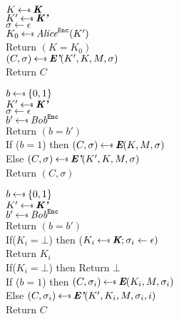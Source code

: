 
\begin{figure}[h]
{
$K\getsr \emph{\textbf{K}}$\\
$K'\getsr \emph{\textbf{K'}}$\\
$\sigma\gets \epsilon$\\
$K_0\getsr \emph{Alice}^{\mathtt{Enc}}(K')$\\
Return $(K=K_0)$\\
$(C,\sigma)\getsr\emph{\textbf{E'}}(K',K,M,\sigma)$\\
Return $C$
}
\vspace{-1ex}
\end{figure}

\begin{figure}[h]
{
$b\getsr \bits$\\
$K'\getsr \emph{\textbf{K'}}$\\
$\sigma\gets \epsilon$\\
$b'\getsr \emph{Bob}^{\mathtt{Enc}}$\\
Return $(b=b')$\\
If ($b=1$) then $(C,\sigma)\getsr \emph{\textbf{E}}(K,M,\sigma)$\\
Else $(C,\sigma)\getsr \emph{\textbf{E'}}(K',K,M,\sigma)$\\
Return $(C,\sigma)$
}
\vspace{-1ex}
\end{figure}

\begin{figure}[h]
{
$b\getsr \bits$\\
$K'\getsr \emph{\textbf{K'}}$\\
$b'\getsr \emph{Bob}^{\mathtt{Enc}}$\\
Return $(b=b')$\\
If($K_i=\bot$) then ($K_i\getsr \emph{\textbf{K}}; \sigma_i \gets \epsilon)$\\
Return $K_i$\\
If($K_i=\bot$) then Return $\bot$\\
If ($b=1$) then $(C,\sigma_i)\getsr \emph{\textbf{E}}(K_i,M,\sigma_i)$\\
Else $(C,\sigma_i)\getsr \emph{\textbf{E'}}(K',K_i,M,\sigma_i,i)$\\
Return $C$
}
\vspace{-1ex}
\end{figure}

